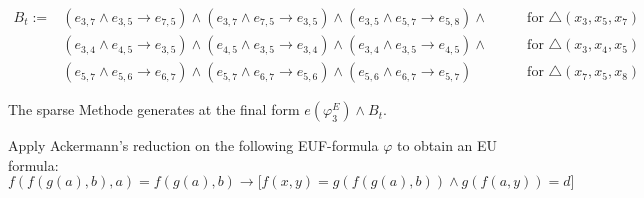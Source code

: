 \documentclass[11pt,a4paper]{uebung}
\begin{document}
\begin{eqnarray*}
    B_t:= &(e_{3,7} \land e_{3,5} \rightarrow e_{7,5}) \land
   (e_{3,7} \land e_{7,5} \rightarrow e_{3,5}) \land
    (e_{3,5} \land e_{5,7} \rightarrow e_{5,8}) \land & \quad \quad \text{for }\triangle
    (x_3,x_5,x_7)\\
    &(e_{3,4} \land e_{4,5} \rightarrow e_{3,5}) \land
    (e_{4,5} \land e_{3,5} \rightarrow e_{3,4}) \land
    (e_{3,4} \land e_{3,5} \rightarrow e_{4,5}) \land & \quad \quad \text{for
    } \triangle (x_3,x_4,x_5)\\
    &(e_{5,7} \land e_{5,6} \rightarrow e_{6,7}) \land
    (e_{5,7} \land e_{6,7} \rightarrow e_{5,6}) \land
    (e_{5,6} \land e_{6,7} \rightarrow e_{5,7}) &\quad \quad\text{for }  \triangle (x_7,x_5,x_8)
  \end{eqnarray*}

  The sparse Methode generates at the final form  $e(\varphi^E_3) \land B_t$.

  


\newpage
{}
Apply Ackermann's reduction on the following EUF-formula $\varphi$ to obtain
an EU formula:
\begin{displaymath}
  f\left(f\left(g\left(a\right),b\right),a\right) = f(g(a),b) \rightarrow \big[ f(x,y) = g(f(g(a),b)) \land
  g(f(a,y))=d \big]
\end{displaymath}
\end{document}
